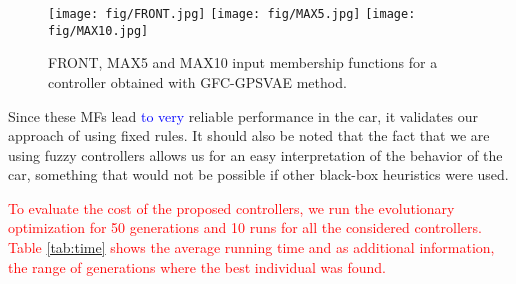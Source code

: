 \documentclass[10pt,journal,compsoc]{IEEEtran}
\begin{document}
%
\begin{figure}[h]	
  \begin{center}
    \texttt{[image: fig/FRONT.jpg]}
    \texttt{[image: fig/MAX5.jpg]}
    \texttt{[image: fig/MAX10.jpg]}		
    \caption{FRONT, MAX5 and MAX10 input membership functions for a controller obtained with {\sf GFC-GPSVAE} method.}
    \label{fig:frontmfs}
\end{center}	
\end{figure}
%
Since these MFs lead \textcolor{blue}{to very} reliable performance in the car, it
validates our approach of using fixed rules. It should
also be noted that the fact that we are using fuzzy controllers allows
us for an easy interpretation of the behavior of the car, something
that would not be possible if other black-box heuristics were used.

	\textcolor{red}{
To evaluate the cost of the proposed controllers, we run the evolutionary optimization for 50 generations and 10 runs for all the considered controllers.
 Table \ref{tab:time} shows the average running time and  as additional information, the range of generations where the best individual was found. } 
\end{document}

